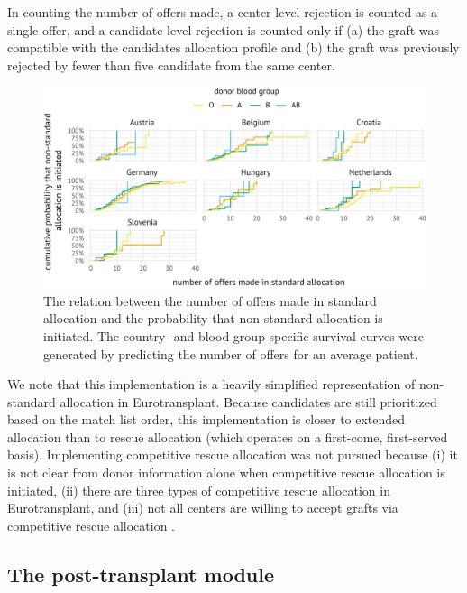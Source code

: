 \documentclass[11pt,twoside,]{book}
\begin{document}
In counting the number of offers made, a center-level rejection is
counted as a single offer, and a candidate-level rejection is counted
only if (a) the graft was compatible with the candidates allocation
profile and (b) the graft was previously rejected by fewer than five
candidate from the same center.

\begin{figure}[ht]

{\centering \includegraphics[width=1\linewidth]{figures/ch5//sfig5-init_rescue} 

}

\caption{The relation between the number of offers made in standard allocation and the probability that non-standard allocation is initiated. The country- and blood group-specific survival curves were generated by predicting the number of offers for an average patient.}\label{fig:ch5sfig5}
\end{figure}

\FloatBarrier

We note that this implementation is a heavily simplified representation of
non-standard allocation in Eurotransplant. Because candidates are still
prioritized based on the match list order, this implementation is closer to
extended allocation than to rescue allocation (which operates on a first-come, first-served basis). Implementing competitive rescue allocation
was not pursued because (i) it is not clear from donor information alone when
competitive rescue allocation is initiated, (ii) there are three types of
competitive rescue allocation in Eurotransplant, and (iii) not all centers are willing to accept grafts via competitive rescue allocation \citep{ETLiverMan2025}.

\subsection{The post-transplant module}\label{sec:elasposttxp}
\end{document}
